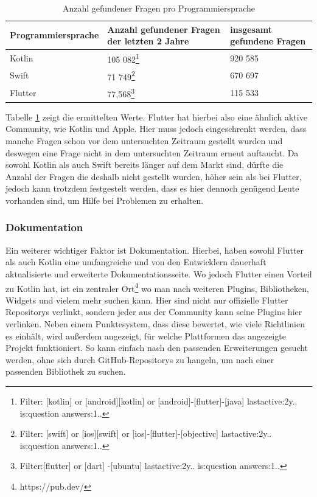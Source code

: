 \begin{table}
\centering
\caption{Anzahl gefundener Fragen pro Programmiersprache}
\begin{tabular}{ |p{3.7cm}||p{5cm}| p{5cm}|}
 \hline
 Programmiersprache & Anzahl gefundener Fragen der letzten 2 Jahre & insgesamt gefundene Fragen\\
 \hline
 Kotlin &  105 082\footnote{Filter: [kotlin] or [android][kotlin] or [android]-[flutter]-[java] lastactive:2y.. is:question answers:1..} & 920 585\\
  \hline
 Swift  & 71 749\footnote{Filter: [swift] or [ios][swift] or [ios]-[flutter]-[objectivc] lastactive:2y.. is:question answers:1..} & 670 697\\
  \hline
 Flutter & 77,568\footnote{Filter:[flutter] or [dart] -[ubuntu] lastactive:2y.. is:question answers:1..} & 115 533\\
 \hline
\end{tabular}
\label{tab:evaluations_questions_stackoverflow}
\end{table}

Tabelle \ref{tab:evaluations_questions_stackoverflow} zeigt die ermittelten Werte. Flutter hat hierbei also eine ähnlich aktive Community, wie Kotlin und Apple. Hier muss jedoch eingeschrenkt werden, dass manche Fragen schon vor dem untersuchten Zeitraum gestellt wurden und deswegen eine Frage nicht in dem untersuchten Zeitraum erneut auftaucht. Da sowohl Kotlin als auch Swift bereits länger auf dem Markt sind, dürfte die Anzahl der Fragen die deshalb nicht gestellt wurden, höher sein als bei Flutter, jedoch kann trotzdem festgestelt werden, dass es hier dennoch genügend Leute vorhanden sind, um Hilfe bei Problemen zu erhalten.

\subsubsection{Dokumentation}
Ein weiterer wichtiger Faktor ist Dokumentation. Hierbei, haben sowohl Flutter als auch Kotlin eine umfangreiche und von den Entwicklern dauerhaft aktualisierte und erweiterte Dokumentationsseite. Wo jedoch Flutter einen Vorteil zu Kotlin hat, ist ein zentraler Ort\footnote{https://pub.dev/} wo man nach weiteren Plugins, Bibliotheken, Widgets und vielem mehr suchen kann. Hier sind nicht nur offizielle Flutter Repositorys verlinkt, sondern jeder aus der Community kann seine Plugins hier verlinken. Neben einem Punktesystem, dass diese bewertet, wie viele Richtlinien es einhält, wird außerdem angezeigt, für welche Plattformen das angezeigte Projekt funktioniert. So kann einfach nach den passenden Erweiterungen gesucht werden, ohne sich durch GitHub-Repositorys zu hangeln, um nach einer passenden Bibliothek zu suchen.

